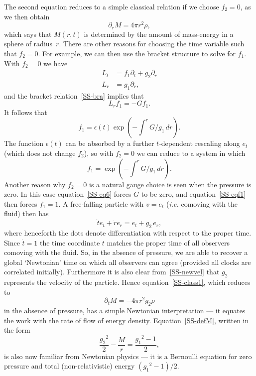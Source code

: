 \documentclass[a4paper]{article}
\numberwithin{equation}{section}
\newcommand{\eps}{\epsilon}
\newcommand{\rdot}{\dot{r}}
\newcommand{\tdot}{\dot{t}}
\newcommand{\dr}{\partial_r}
\newcommand{\dift}{\partial_t}
\begin{document}
The second equation reduces to a simple classical relation if
we choose $f_2 = 0$, as we then obtain
%
\begin{equation}
\dr M = 4 \pi r^2 \rho,
\end{equation}
%
which says that $M(r,t)$ is determined by the amount of mass-energy in
a sphere of radius~$r$.  There are other reasons for choosing the time
variable such that $f_2=0$.  For example, we can then use the bracket
structure to solve for $f_1$.  With $f_2=0$ we have
%
\begin{align}
L_t &= f_1 \partial_t + g_2 \dr \\
L_r &= g_1 \dr,
\end{align}
%
and the bracket relation~\eqref{SS-bra} implies that
%
\begin{equation}
L_r f_1 = - G f_1.
\end{equation}
%
It follows that
%
\begin{equation} 
f_1 = \eps(t) \exp \left( - \int^r G /g_1 \, dr \right).
\end{equation}
%
The function $\eps(t)$ can be absorbed by a further $t$-dependent
rescaling along $e_t$ (which does not change $f_2$), so with $f_2=0$
we can reduce to a system in which
%
\begin{equation}
f_1 = \exp \left( - \int^r G /g_1 \, dr \right).
\label{SS-eqf1}
\end{equation}
%
Another reason why $f_2=0$ is a natural gauge choice is seen when the
pressure is zero.  In this case equation~\eqref{SS-eq6} forces $G$ to be
zero, and equation~\eqref{SS-eqf1} then forces $f_1=1$.  A free-falling
particle with $v=e_t$ ({\em i.e.} comoving with the fluid) then has
%
\begin{equation}
\tdot e_t + \rdot e_r = e_t + g_2 \, e_r,
\label{SS-newvel}
\end{equation}
%
where henceforth the dots denote differentiation with respect to the
proper time.  Since $\tdot=1$ the time coordinate $t$ matches the
proper time of all observers comoving with the fluid.  So, in the
absence of pressure, we are able to recover a global `Newtonian' time
on which all observers can agree (provided all clocks are correlated
initially).  Furthermore it is also clear from~\eqref{SS-newvel} that
$g_2$ represents the velocity of the particle.  Hence
equation~\eqref{SS-class1}, which reduces to
%
\begin{equation}
\dift M = -4 \pi r^2 g_2 \rho
\end{equation}
%
in the absence of pressure, has a simple Newtonian interpretation ---
it equates the work with the rate of flow of energy density.
Equation~\eqref{SS-defM}, written in the form
%
\begin{equation}
\frac{{g_2}^2}{2} -\frac{M}{r} = \frac{{g_1}^2-1}{2},
\end{equation}
%
is also now familiar from Newtonian physics --- it is a Bernoulli
equation for zero pressure and total (non-relativistic) energy
$({g_1}^2-1)/2$.
\end{document}
